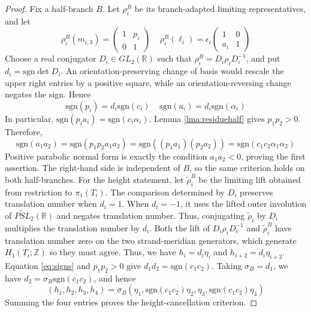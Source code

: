 \documentclass{article}
\theoremstyle{plain}
\theoremstyle{definition}
\theoremstyle{plain}
\theoremstyle{plain}
\theoremstyle{plain}
\theoremstyle{remark}
\theoremstyle{remark}
\theoremstyle{plain}
\theoremstyle{plain}
\theoremstyle{plain}
\theoremstyle{plain}
\begin{document}
\begin{proof}
Fix a half-branch $B$. Let $\rho_i^B$ be its branch-adapted limiting representatives, and let  
\begin{equation*}
	\rho_i^B(m_{i, 3}) = \begin{pmatrix}1&p_i\\0&1\end{pmatrix} \ \ \ \ \ \rho_i^B(\ell_i) = \epsilon_i\begin{pmatrix}1&0\\a_i&1\end{pmatrix}
\end{equation*}
Choose a real conjugator $D_i \in GL_2(\mathbb R)$ such that $\rho_i^B = D_i\rho_iD_i^{-1}$, and put $d_i = \mathrm{sgn}\det D_i$. An orientation-preserving change of basis would rescale the upper right entries by a positive square, while an orientation-reversing change negates the sign. Hence
\begin{equation}\label{eq:signs}
	\mathrm{sgn}(p_i) = d_i\mathrm{sgn}(c_i) \ \ \ \ \ \mathrm{sgn}(a_i) = d_i\mathrm{sgn}(\alpha_i)
\end{equation}
In particular, $\mathrm{sgn}(p_i a_i) = \mathrm{sgn}(c_i\alpha_i)$. Lemma \ref{lma:residuehalf} gives $p_1p_2 > 0$. Therefore, 
\begin{equation*}
	\mathrm{sgn}(a_1a_2) = \mathrm{sgn}(p_1p_2a_1a_2) = \mathrm{sgn}((p_1a_1)(p_2a_2)) = \mathrm{sgn}(c_1c_2\alpha_1\alpha_2)
\end{equation*}
Positive parabolic normal form is exactly the condition $a_1a_2 < 0$, proving the first assertion. The right-hand side is independent of $B$, so the same criterion holds on both half-branches. For the height statement, let $\widetilde\rho_i^B$ be the limiting lift obtained from restriction to $\pi_1(T_i)$. The comparison determined by $D_i$ preserves translation number when $d_i = 1$. When $d_i = -1$, it uses the lifted outer involution of $\widetilde{PSL}_2(\mathbb R)$ and negates translation number. Thus, conjugating $\widetilde\rho_i$ by $D_i$ multiplies the translation number by $d_i$. Both the lift of $D_i\rho_iD_i^{-1}$ and $\widetilde\rho_i^B$ have translation number zero on the two strand-meridian generators, which generate $H_1(T_i; \mathbb Z)$ so they must agree. Thus, we have $h_i = d_i\eta_i$ and $h_{i+2} = d_i\eta_{i+2}$. Equation \eqref{eq:signs} and $p_1p_2 > 0$ give $d_1d_2 = \mathrm{sgn}(c_1c_2)$. Taking $\sigma_B = d_1$, we have $d_2 = \sigma_B\mathrm{sgn}(c_1c_2)$, and hence
\begin{equation*}
	(h_1, h_2, h_3, h_4) = \sigma_B(\eta_1, \mathrm{sgn}(c_1c_2)\eta_2, \eta_3, \mathrm{sgn}(c_1c_2)\eta_4)
\end{equation*}
Summing the four entries proves the height-cancellation criterion. 
\end{proof}
\end{document}
